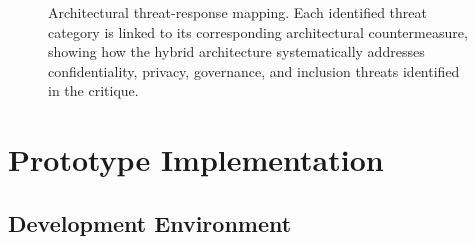 \documentclass[AMA,LATO1COL]{WileyNJD-v2}
\begin{document}
\begin{figure}[!ht]
\centering
{}
\caption{Architectural threat-response mapping. Each identified threat category is linked to its corresponding architectural countermeasure, showing how the hybrid architecture systematically addresses confidentiality, privacy, governance, and inclusion threats identified in the critique.}\label{fig:threats}
\end{figure}
%
%
%
%

\section{Prototype Implementation}\label{sec:implementation}

\subsection{Development Environment}\label{subsec:devenv}
\end{document}
